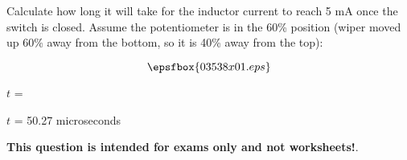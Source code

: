 

Calculate how long it will take for the inductor current to reach 5 mA once the switch is closed.  Assume the potentiometer is in the 60\% position (wiper moved up 60\% away from the bottom, so it is 40\% away from the top):

$$\epsfbox{03538x01.eps}$$

$t$ = 







$t$ = 50.27 microseconds







{\bf This question is intended for exams only and not worksheets!}.



